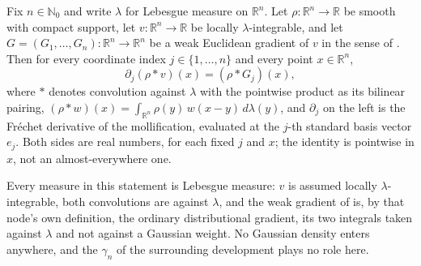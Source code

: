 \begin{lemma}
Fix $n \in \mathbb{N}_0$ and write $\lambda$ for Lebesgue measure on
$\mathbb{R}^n$.  Let $\rho : \mathbb{R}^n \to \mathbb{R}$ be smooth with compact
support, let $v : \mathbb{R}^n \to \mathbb{R}$ be locally
$\lambda$-integrable, and let $G = (G_1,\ldots,G_n) : \mathbb{R}^n \to
\mathbb{R}^n$ be a weak Euclidean gradient of $v$ in the sense of
.  Then for every coordinate index
$j \in \{1,\ldots,n\}$ and every point $x \in \mathbb{R}^n$,
\[
  \partial_j (\rho * v)(x) = (\rho * G_j)(x) ,
\]
where $*$ denotes convolution against $\lambda$ with the pointwise product as
its bilinear pairing,
$(\rho * w)(x) = \int_{\mathbb{R}^n} \rho(y)\, w(x - y)\, d\lambda(y)$, and
$\partial_j$ on the left is the Fr\'echet derivative of the mollification,
evaluated at the $j$-th standard basis vector $e_j$.  Both sides are real
numbers, for each fixed $j$ and $x$; the identity is pointwise in $x$, not an
almost-everywhere one.

Every measure in this statement is Lebesgue measure: $v$ is assumed locally
$\lambda$-integrable, both convolutions are against $\lambda$, and the weak
gradient of  is, by that node's own definition, the
ordinary distributional gradient, its two integrals taken against $\lambda$ and
not against a Gaussian weight.  No Gaussian density enters anywhere, and the
$\gamma_n$ of the surrounding development plays no role here.
\end{lemma}

